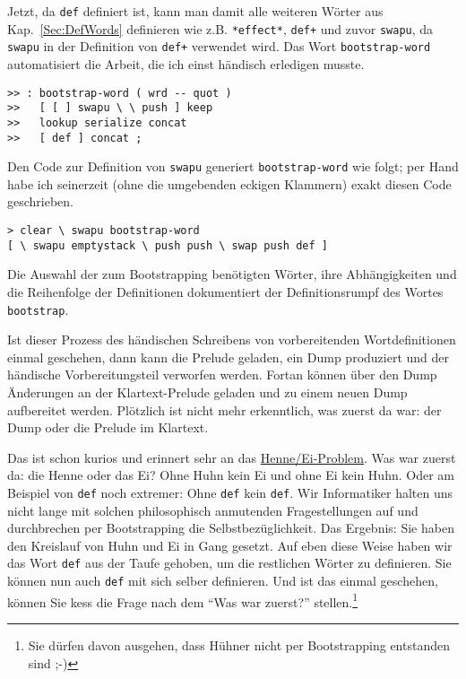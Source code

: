 Jetzt, da \verb|def| definiert ist, kann man damit alle weiteren Wörter aus Kap.~\ref{Sec:DefWords} definieren wie z.B. \verb|*effect*|, \verb|def+| und zuvor \verb|swapu|, da \verb|swapu| in der Definition von \verb|def+| verwendet wird. Das Wort \verb|bootstrap-word| automatisiert die Arbeit, die ich einst händisch erledigen musste.

\begin{verbatim}
>> : bootstrap-word ( wrd -- quot )
>>   [ [ ] swapu \ \ push ] keep
>>   lookup serialize concat
>>   [ def ] concat ;
\end{verbatim}

Den Code zur Definition von \verb|swapu| generiert \verb|bootstrap-word| wie folgt; per Hand habe ich seinerzeit (ohne die umgebenden eckigen Klammern) exakt diesen Code geschrieben.

\begin{verbatim}
> clear \ swapu bootstrap-word
[ \ swapu emptystack \ push push \ swap push def ]
\end{verbatim}

Die Auswahl der zum Bootstrapping benötigten Wörter, ihre Ab\-hän\-gig\-kei\-ten und die Reihenfolge der Definitionen dokumentiert der Definitionsrumpf des Wortes \verb|bootstrap|.

Ist dieser Prozess des händischen Schreibens von vorbereitenden Wortdefinitionen einmal geschehen, dann kann die Prelude geladen, ein Dump produziert und der händische Vorbereitungsteil verworfen werden. Fortan können über den Dump Änderungen an der Klartext-Prelude geladen und zu einem neuen Dump aufbereitet werden. Plötzlich ist nicht mehr erkenntlich, was zuerst da war: der Dump oder die Prelude im Klartext.

Das ist schon kurios und erinnert sehr an das \href{http://de.wikipedia.org/wiki/Henne-Ei-Problem}{Henne/Ei-Problem}. Was war zuerst da: die Henne oder das Ei? Ohne Huhn kein Ei und ohne Ei kein Huhn. Oder am Beispiel von \verb|def| noch extremer: Ohne \verb|def| kein \verb|def|. Wir Informatiker halten uns nicht lange mit solchen philosophisch anmutenden Fragestellungen auf und durchbrechen per Bootstrapping die Selbstbezüglichkeit. Das Ergebnis: Sie haben den Kreislauf von Huhn und Ei in Gang gesetzt. Auf eben diese Weise haben wir das Wort \verb|def| aus der Taufe gehoben, um die restlichen Wörter zu definieren. Sie können nun auch \verb|def| mit sich selber definieren.
Und ist das einmal geschehen, können Sie kess die Frage nach dem "`Was war zuerst?"' stellen.\footnote{Sie dürfen davon ausgehen, dass Hühner nicht per Bootstrapping entstanden sind ;-)}

